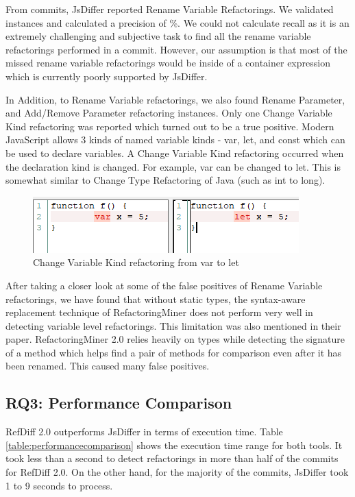 \documentclass[letterpaper,12pt,onecolumn,final]{report}
\begin{document}
From \evTotalCommits{} commits, JsDiffer reported \renameVarTotalCount{} Rename Variable Refactorings. We validated \renameVarValidatedCount{} instances and calculated a precision of \renameVarPrecision{}\%.
We could not calculate recall as it is an extremely challenging and subjective task to find all the rename variable refactorings performed in a commit. However, our assumption is that most of the missed rename variable refactorings would be inside of a container expression which is currently poorly supported by JsDiffer.

In Addition, to Rename Variable refactorings, we also found Rename Parameter, and Add/Remove Parameter refactoring instances. Only one Change Variable Kind refactoring was reported which turned out to be a true positive. Modern JavaScript allows 3 kinds of named variable kinds - var, let, and const which can be used to declare variables. A Change Variable Kind refactoring occurred when the declaration kind is changed. For example, var can be changed to let. This is somewhat similar to Change Type Refactoring of Java (such as int to long).

\begin{figure}
\centering
\includegraphics[keepaspectratio]{images/change_var_kind}
  \caption{Change Variable Kind refactoring from var to let}
   \label{fig:extractToggle}
\end{figure}

After taking a closer look at some of the false positives of Rename Variable refactorings, we have found that without static types, the syntax-aware replacement technique of RefactoringMiner does not perform very well in detecting variable level refactorings. This limitation was also mentioned in their paper. RefactoringMiner 2.0 relies heavily on types while detecting the signature of a method which helps find a pair of methods for comparison even after it has been renamed. This caused many false positives.


\subsection{RQ3: Performance Comparison}

RefDiff 2.0 outperforms JsDiffer in terms of execution time. Table \ref{table:performancecomparison} shows the execution time range for both tools. It took less than a second to detect refactorings in more than half of the commits for RefDiff 2.0. On the other hand, for the majority of the commits, JsDiffer took 1 to 9 seconds to process.
\end{document}
